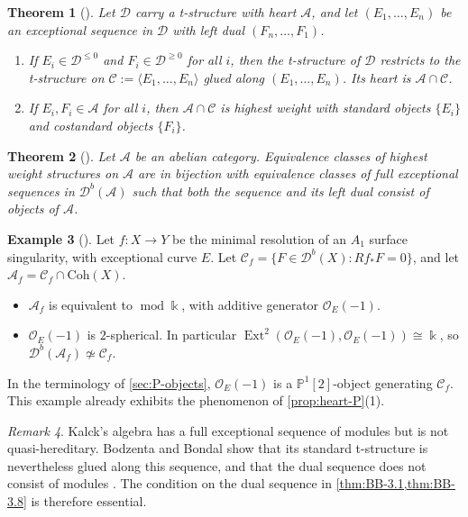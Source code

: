 \documentclass[11pt,reqno]{amsart}
\theoremstyle{plain}
\newtheorem{theorem}{Theorem}[section]
\theoremstyle{definition}
\newtheorem{example}[theorem]{Example}
\theoremstyle{remark}
\newtheorem{remark}[theorem]{Remark}
\newcommand{\kk}{\Bbbk}
\DeclareMathOperator{\Ext}{Ext}
\newcommand{\modd}{\operatorname{mod}}
\newcommand{\Db}{\mathcal{D}^b}
\newcommand{\thick}[1]{\langle #1\rangle}
\newcommand{\Pn}[2]{\mathbb{P}^{#1}[#2]}
\newcommand{\cD}{\mathcal{D}}
\newcommand{\cA}{\mathcal{A}}
\newcommand{\cC}{\mathcal{C}}
\newcommand{\cO}{\mathcal{O}}
\begin{document}
\begin{theorem}[{\cite[Thm.~3.4]{BB26}}]\label{thm:BB-3.4}
Let $\cD$ carry a t-structure with heart $\cA$, and let $(E_1,\dots,E_n)$ be an exceptional sequence in $\cD$ with left dual $(F_n,\dots,F_1)$.
\begin{enumerate}
\item If $E_i\in\cD^{\le0}$ and $F_i\in\cD^{\ge0}$ for all $i$, then the t-structure of $\cD$ restricts to the t-structure on $\cC:=\thick{E_1,\dots,E_n}$ glued along $(E_1,\dots,E_n)$. Its heart is $\cA\cap\cC$.
\item If $E_i,F_i\in\cA$ for all $i$, then $\cA\cap\cC$ is highest weight with standard objects $\{E_i\}$ and costandard objects $\{F_i\}$.
\end{enumerate}
\end{theorem}

\begin{theorem}[{\cite[Thm.~3.8]{BB26}}]\label{thm:BB-3.8}
Let $\cA$ be an abelian category. Equivalence classes of highest weight structures on $\cA$ are in bijection with equivalence classes of full exceptional sequences in $\Db(\cA)$ such that both the sequence and its left dual consist of objects of $\cA$.
\end{theorem}

\begin{example}[{\cite[Ex.~5.11]{BB26}}]\label{ex:BB-5.11}
Let $f\colon X\to Y$ be the minimal resolution of an $A_1$ surface singularity, with exceptional curve $E$. Let $\cC_f=\{F\in\Db(X):Rf_*F=0\}$, and let $\mathcal{A}_f=\cC_f\cap\mathrm{Coh}(X)$.
\begin{itemize}
\item $\mathcal{A}_f$ is equivalent to $\modd\kk$, with additive generator $\cO_E(-1)$.
\item $\cO_E(-1)$ is $2$-spherical. In particular $\Ext^2(\cO_E(-1),\cO_E(-1))\cong\kk$, so $\Db(\mathcal{A}_f)\not\simeq\cC_f$.
\end{itemize}
In the terminology of \cref{sec:P-objects}, $\cO_E(-1)$ is a $\Pn12$-object generating $\cC_f$. This example already exhibits the phenomenon of \cref{prop:heart-P}(1).
\end{example}

\begin{remark}
Kalck's algebra \cite[Prop.~5.6]{Kal17} has a full exceptional sequence of modules but is not quasi-hereditary. Bodzenta and Bondal show that its standard t-structure is nevertheless glued along this sequence, and that the dual sequence does not consist of modules \cite[\S4.1]{BB26}. The condition on the dual sequence in \cref{thm:BB-3.1,thm:BB-3.8} is therefore essential.
\end{remark}
\end{document}
